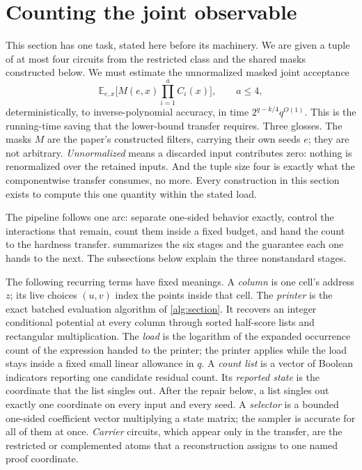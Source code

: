 \documentclass[11pt,letterpaper]{article}
\theoremstyle{definition}
\theoremstyle{remark}
\newcommand{\E}{\mathbb E}
\begin{document}
\section{Counting the joint observable}
\label{sec:count-overview}

This section has one task, stated here before its machinery. We are
given a tuple of at most four circuits from the restricted class and
the shared masks constructed below. We must estimate the unnormalized
masked joint acceptance
\[
\E_{e,x}\Big[M(e,x)\prod_{i=1}^{a}C_i(x)\Big],\qquad a\le4,
\]
deterministically, to inverse-polynomial accuracy, in time
$2^{q-k/4}q^{O(1)}$. This is the running-time saving that the
lower-bound transfer requires. Three glosses.
The masks $M$ are the paper's constructed filters, carrying their own
seeds $e$; they are not arbitrary. \emph{Unnormalized} means a
discarded input contributes zero: nothing is renormalized over the
retained inputs. And the tuple size four is exactly what the
componentwise transfer consumes, no more. Every construction in this
section exists to compute this one quantity within the stated load.

The pipeline follows one arc: separate one-sided behavior exactly,
control the interactions that remain, count them inside a fixed
budget, and hand the count to the hardness transfer.
 summarizes the six stages and the guarantee each
one hands to the next. The subsections below explain the three
nonstandard stages.

The following recurring terms have fixed meanings. A \emph{column} is one
cell's address $z$; its live choices $(u,v)$ index the points inside
that cell. The \emph{printer} is the exact batched evaluation
algorithm of \cref{alg:section}. It recovers an integer conditional
potential at every column through sorted half-score lists and
rectangular multiplication. The \emph{load} is the logarithm of the
expanded occurrence count of the expression handed to the printer;
the printer applies while the load stays inside a fixed small linear
allowance in $q$. A \emph{count list} is a vector of Boolean
indicators reporting one candidate residual count. Its
\emph{reported state} is the coordinate that the list singles out.
After the repair below, a list singles out exactly one coordinate on
every input and every seed. A \emph{selector} is a bounded one-sided coefficient vector
multiplying a state matrix; the sampler is accurate for all of them
at once. \emph{Carrier} circuits, which appear only in the transfer,
are the restricted or complemented atoms that a reconstruction
assigns to one named proof coordinate.
\end{document}
